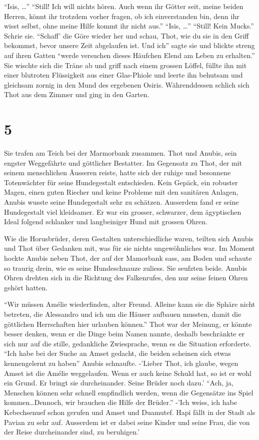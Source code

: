 \documentclass[11pt,titlepage,a5paper]{book}
\begin{document}
 "`Isis, \dots"' "`Still! Ich will nichts hören. Auch wenn ihr Götter seit, meine beiden Herren, könnt ihr trotzdem vorher fragen, ob ich einverstanden bin, denn ihr wisst selbst, ohne meine Hilfe kommt ihr nicht aus."' "`Isis, \dots"' "`Still! Kein Mucks."' Schrie sie. "`Schaff' die Göre wieder her und schau, Thot, wie du sie in den Griff bekommst, bevor unsere Zeit abgelaufen ist. Und ich"' sagte sie und blickte streng auf ihren Gatten "`werde versuchen dieses Häufchen Elend am Leben zu erhalten."' Sie wischte sich die Träne ab und griff nach einem grossen Löffel, füllte ihn mit einer blutroten Flüssigkeit aus einer Glas-Phiole und leerte ihn behutsam und gleichsam zornig in den Mund des ergebenen Osiris. Währenddessen schlich sich Thot aus dem Zimmer und ging in den Garten.



\section*{5}

Sie trafen am Teich bei der Marmorbank zusammen. Thot und Anubis, sein engster Weggefährte und göttlicher Bestatter. Im Gegensatz zu Thot, der mit seinem menschlichen Äusseren reiste, hatte sich der ruhige und besonnene Totenwächter für seine Hundegestalt entschieden. Kein Gepäck, ein robuster Magen, einen guten Riecher und keine Probleme mit den sanitären Anlagen, Anubis wusste seine Hundegestalt sehr zu schätzen. Ausserdem fand er seine Hundegestalt viel kleidsamer. Er war ein grosser, schwarzer, dem ägyptischen Ideal folgend schlanker und langbeiniger Hund mit grossen Ohren.

Wie die Horusbrüder, deren Gestalten unterschiedliche waren, teilten sich Anubis und Thot über Gedanken mit, was für sie nichts ungewöhnliches war. Im Moment hockte Anubis neben Thot, der auf der Mamorbank sass, am Boden und schaute so traurig drein, wie es seine Hundeschnauze zuliess. Sie seufzten beide. Anubis Ohren drehten sich in die Richtung des Falkenrufes, den nur seine feinen Ohren gehört hatten. 

"`Wir müssen Amélie wiederfinden, alter Freund. Alleine kann sie die Sphäre nicht betreten, die Alessandro und ich um die Häuser aufbauen mussten, damit die göttlichen Herrschaften hier urlauben können."' Thot war der Meinung, er könnte besser denken, wenn er die Dinge beim Namen nannte, deshalb beschränkte er sich nur auf die stille, gedankliche Zwiesprache, wenn es die Situation erforderte. "`Ich habe bei der Suche an Amset gedacht, die beiden scheinen sich etwas kennengelernt zu haben"' Anubis schnaufte. -'Lieber Thot, ich glaube, wegen Amset ist die Amélie weggelaufen. Wenn er auch keine Schuld hat, so ist er wohl ein Grund. Er bringt sie durcheinander. Seine Brüder noch dazu.' "`Ach, ja, Menschen können sehr schnell empfindlich werden, wenn die Gegensätze ins Spiel kommen\dots Dennoch, wir brauchen die Hilfe der Brüder."' -'Ich weiss, ich habe Kebechsenuef schon gerufen und Amset und Duamutef. Hapi fällt in der Stadt als Pavian zu sehr auf. Ausserdem ist er dabei seine Kinder und seine Frau, die von der Reise durcheinander sind, zu beruhigen.' 
\end{document}
